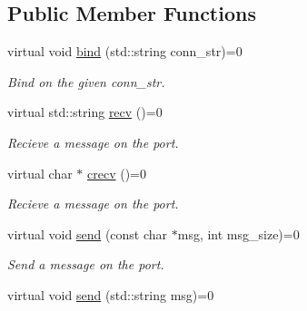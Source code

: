\subsection*{Public Member Functions}
\begin{DoxyCompactItemize}
\item 
virtual void \hyperlink{classZmqIn_ad6037a187635f7d46bab5da961156751}{bind} (std\+::string conn\+\_\+str)=0\hypertarget{classZmqIn_ad6037a187635f7d46bab5da961156751}{}\label{classZmqIn_ad6037a187635f7d46bab5da961156751}

\begin{DoxyCompactList}\small\item\em Bind on the given conn\+\_\+str. \end{DoxyCompactList}\item 
virtual std\+::string \hyperlink{classZmqIn_a375de593defd4c2cf3adebad063950fe}{recv} ()=0\hypertarget{classZmqIn_a375de593defd4c2cf3adebad063950fe}{}\label{classZmqIn_a375de593defd4c2cf3adebad063950fe}

\begin{DoxyCompactList}\small\item\em Recieve a message on the port. \end{DoxyCompactList}\item 
virtual char $\ast$ \hyperlink{classZmqIn_ad0ff1eaef4590f8937fbc3eb8ba116be}{crecv} ()=0\hypertarget{classZmqIn_ad0ff1eaef4590f8937fbc3eb8ba116be}{}\label{classZmqIn_ad0ff1eaef4590f8937fbc3eb8ba116be}

\begin{DoxyCompactList}\small\item\em Recieve a message on the port. \end{DoxyCompactList}\item 
virtual void \hyperlink{classZmqIn_ad2a35cc76a5b0b2412fda5418f708e60}{send} (const char $\ast$msg, int msg\+\_\+size)=0\hypertarget{classZmqIn_ad2a35cc76a5b0b2412fda5418f708e60}{}\label{classZmqIn_ad2a35cc76a5b0b2412fda5418f708e60}

\begin{DoxyCompactList}\small\item\em Send a message on the port. \end{DoxyCompactList}\item 
virtual void \hyperlink{classZmqIn_adf4165c263ddc5b68099b93b9f37f592}{send} (std\+::string msg)=0\hypertarget{classZmqIn_adf4165c263ddc5b68099b93b9f37f592}{}\label{classZmqIn_adf4165c263ddc5b68099b93b9f37f592}


\end{DoxyCompactItemize}
